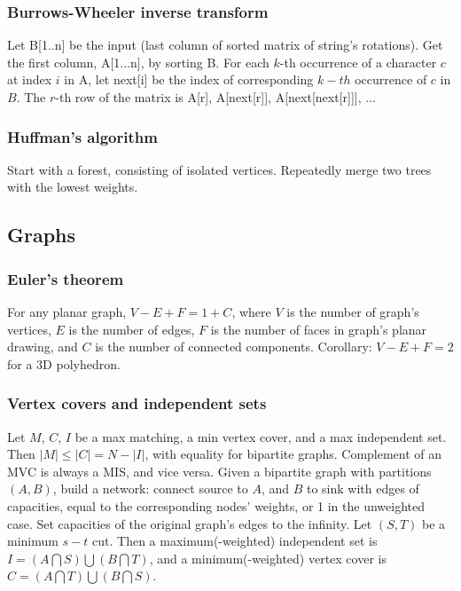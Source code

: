 \documentclass[a4paper,12pt]{article}
\begin{document}
\subsubsection{Burrows-Wheeler inverse transform}
Let B[1..n] be the input (last column of sorted matrix of string's rotations). Get the first column, A[1...n], by sorting B. For each $k$-th occurrence of a character $c$ at index $i$ in A, let next[i] be the index of corresponding $k-th$ occurrence of $c$ in $B$. The $r$-th row of the matrix is A[r], A[next[r]], A[next[next[r]]], ... 

\subsubsection{Huffman's algorithm}
Start with a forest, consisting of isolated vertices. Repeatedly merge two trees with the lowest weights.


\newpage

\subsection{Graphs}
\subsubsection{Euler’s theorem}
For any planar graph, $V - E + F = 1 + C$, where $V$ is the number of graph’s vertices, $E$ is the number of edges, $F$ is the number of faces in graph’s planar drawing,
and $C$ is the number of connected components. Corollary: $V - E + F = 2$ for a 3D polyhedron.

\subsubsection{Vertex covers and independent sets}
Let $M$, $C$, $I$ be a max matching, a min vertex cover, and a max independent set. Then $|M| \leq |C| = N - |I|$, with equality for bipartite graphs. Complement of an MVC is always a MIS, and vice versa.
Given a bipartite graph with partitions $(A,B)$, build a network: connect source to $A$, and $B$ to sink with edges of capacities, equal to the corresponding nodes’ weights, or 1 in the unweighted case.
Set capacities of the original graph’s edges to the infinity. Let $(S,T)$ be a minimum $s-t$ cut. 
Then a maximum(-weighted) independent set is $I = (A \bigcap S) \bigcup (B \bigcap T)$, and a minimum(-weighted) vertex cover is $C = (A \bigcap T) \bigcup (B \bigcap S)$.
\end{document}
